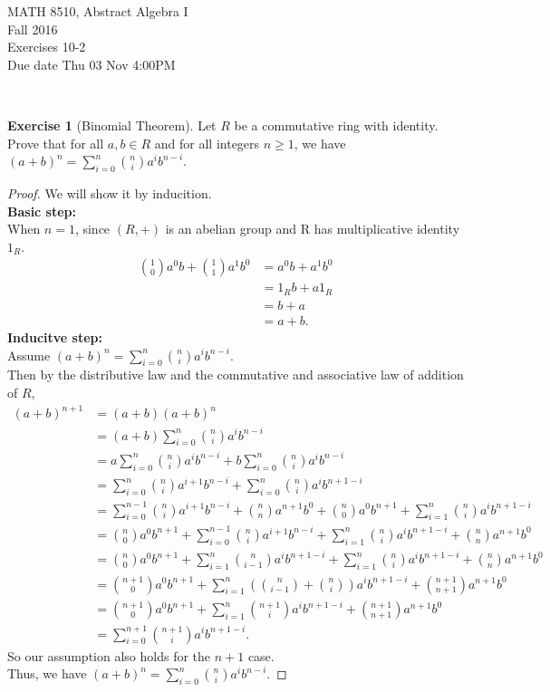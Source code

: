 \documentclass{amsart}
\theoremstyle{plain}
\theoremstyle{definition}
\newtheorem{exer}[lem]{Exercise}
\begin{document}
\noindent MATH 8510, Abstract Algebra I \\
Fall 2016\\
Exercises 10-2\\
Due date Thu 03 Nov 4:00PM

\

%
%

\begin{exer}[Binomial Theorem]
Let $R$ be a commutative ring with identity.
Prove that for all $a,b\in R$ and for all integers $n\geq 1$, we have
$(a+b)^n=\sum_{i=0}^n\binom nia^ib^{n-i}$.
\end{exer}
\begin{proof}
  	We will show it by inducition.\\
	\textbf{Basic step:}\\
	When $n=1$, since $(R,+)$ is an abelian group and R has multiplicative identity $1_R$.
	\begin{align*}
	 		\binom 10a^0b +	\binom 11 a^1b^0 &=a^0b + a^1b^0 \\
	 				  &= 1_Rb+a1_R \\
	  				  &=b+a\\
	  		          &=a+b.
	\end{align*}
	\textbf{Inducitve step:}\\
	Assume $(a+b)^n=\sum_{i=0}^n\binom nia^ib^{n-i}$.\\
	Then by the distributive law and the commutative and associative law of addition of $R$,
	\begin{align*}
	  (a+b)^{n+1} &=(a+b)(a+b)^n \\
	  			  &=(a+b)\sum_{i=0}^n\binom nia^ib^{n-i}\\
	  			  &=a\sum_{i=0}^n\binom nia^ib^{n-i} + b\sum_{i=0}^n\binom nia^ib^{n-i}\\ 
	  			  &=\sum_{i=0}^n\binom nia^{i+1}b^{n-i} + \sum_{i=0}^n\binom nia^ib^{n+1-i}\\ 
	  			  &=\sum_{i=0}^{n-1}\binom nia^{i+1}b^{n-i} + \binom nna^{n+1}b^{0} + \binom n0a^0b^{n+1} + \sum_{i=1}^n\binom nia^ib^{n+1-i} \\ 
	  			  &=\binom {n}{0}a^{0}b^{n+1} +\sum_{i=0}^{n-1}\binom n{i}a^{i+1}b^{n-i} + \sum_{i=1}^n\binom nia^ib^{n+1-i} + \binom {n}{n}a^{n+1}b^{0} \\
	  			  &=\binom {n}{0}a^{0}b^{n+1} +\sum_{i=1}^{n}\binom n{i-1}a^{i}b^{n+1-i} + \sum_{i=1}^n\binom nia^ib^{n+1-i} + \binom {n}{n}a^{n+1}b^{0} \\
	  			  &=\binom {n+1}0a^{0}b^{n+1} +\sum_{i=1}^{n}\left(\binom n{i-1} + \binom ni\right)a^{i}b^{n+1-i} + \binom {n+1}{n+1}a^{n+1}b^{0} \\
	  			  &=\binom {n+1}0a^{0}b^{n+1} +\sum_{i=1}^{n}\binom {n+1}i a^{i}b^{n+1-i} + \binom {n+1}{n+1}a^{n+1}b^{0} \\
	  			  &=\sum_{i=0}^{n+1}\binom {n+1}ia^ib^{n+1-i}.
	\end{align*}
	So our assumption also holds for the $n+1$ case.\\
	Thus, we have $(a+b)^n=\sum_{i=0}^n\binom nia^ib^{n-i}$.
	
\end{proof}
\end{document}
